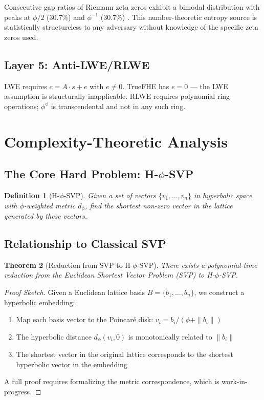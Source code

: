 \documentclass[11pt,a4paper]{article}
\newtheorem{theorem}{Theorem}[section]
\newtheorem{definition}[theorem]{Definition}
\theoremstyle{remark}
\begin{document}
Consecutive gap ratios of Riemann zeta zeros exhibit a bimodal distribution with peaks at $\phi/2$ (30.7\%) and $\phi^{-1}$ (30.7\%) \cite{fernandez2026zeta}. This number-theoretic entropy source is statistically structureless to any adversary without knowledge of the specific zeta zeros used.

\subsection{Layer 5: Anti-LWE/RLWE}

LWE requires $c = A \cdot s + e$ with $e \neq 0$. TrueFHE has $e = 0$ — the LWE assumption is structurally inapplicable. RLWE requires polynomial ring operations; $\phi^\phi$ is transcendental and not in any such ring.

\section{Complexity-Theoretic Analysis}
\label{sec:complexity}

\subsection{The Core Hard Problem: H-$\phi$-SVP}

\begin{definition}[H-$\phi$-SVP]
Given a set of vectors $\{v_1, \ldots, v_n\}$ in hyperbolic space with $\phi$-weighted metric $d_\phi$, find the shortest non-zero vector in the lattice generated by these vectors.
\end{definition}

\subsection{Relationship to Classical SVP}

\begin{theorem}[Reduction from SVP to H-$\phi$-SVP]
There exists a polynomial-time reduction from the Euclidean Shortest Vector Problem (SVP) to H-$\phi$-SVP.
\end{theorem}

\begin{proof}[Proof Sketch]
Given a Euclidean lattice basis $B = \{b_1, \ldots, b_n\}$, we construct a hyperbolic embedding:
\begin{enumerate}
    \item Map each basis vector to the Poincar\'{e} disk: $v_i = b_i / (\phi + \|b_i\|)$
    \item The hyperbolic distance $d_\phi(v_i, 0)$ is monotonically related to $\|b_i\|$
    \item The shortest vector in the original lattice corresponds to the shortest hyperbolic vector in the embedding
\end{enumerate}
A full proof requires formalizing the metric correspondence, which is work-in-progress.
\end{proof}
\end{document}
